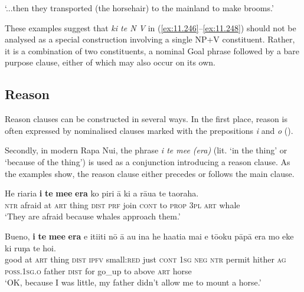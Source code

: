 \glt
‘...then they transported (the horsehair) to the mainland to make brooms.’ \textstyleExampleref{[R539-02.091]}
\z

These examples suggest that \textit{ki te N V} in (\ref{ex:11.246}–\ref{ex:11.248}) should not be analysed as a special construction involving a single NP+V constituent. Rather, it is a combination of two constituents, a nominal Goal phrase followed by a bare purpose clause, either of which may also occur on its own. 

\subsection{Reason}\label{sec:11.6.4}
Reason clauses can be constructed in several ways. In the first place, reason is often expressed by nominalised clauses marked with the prepositions \textit{{\ꞌ}i} and \textit{{\ꞌ}o} (). 

Secondly, in modern Rapa Nui, the phrase \textit{{\ꞌ}i te me{\ꞌ}e (era)} (lit. ‘in the thing’ or ‘because of the thing’) is used as a conjunction introducing a reason clause. As the examples show, the reason clause either precedes or follows the main clause.

\ea\label{ex:11.254}
\gll He ri{\ꞌ}ari{\ꞌ}a \textbf{{\ꞌ}i} \textbf{te} \textbf{me{\ꞌ}e} \textbf{era} ko piri {\ꞌ}ā ki a rāua te ta{\ꞌ}oraha. \\
\textsc{ntr} afraid at \textsc{art} thing \textsc{dist} \textsc{prf} join \textsc{cont} to \textsc{prop} \textsc{3pl} \textsc{art} whale \\

\glt 
‘They are afraid because whales approach them.’ \textstyleExampleref{[R364.038–039]} 
\z

\ea\label{ex:11.255}
\gll Bueno, \textbf{{\ꞌ}i} \textbf{te} \textbf{me{\ꞌ}e} \textbf{era} e {\ꞌ}iti{\ꞌ}iti nō {\ꞌ}ā au {\ꞌ}ina he ha{\ꞌ}ati{\ꞌ}a mai  e tō{\ꞌ}oku pāpā era mo eke ki ruŋa te hoi.\\
good at \textsc{art} thing \textsc{dist} \textsc{ipfv} small:\textsc{red} just \textsc{cont} \textsc{1sg} \textsc{neg} \textsc{ntr} permit hither  \textsc{ag} \textsc{poss.1sg.o} father \textsc{dist} for go\_up to above \textsc{art} horse\\

\glt 
‘OK, because I was little, my father didn’t allow me to mount a horse.’ \textstyleExampleref{[R101.004]} 
\z

